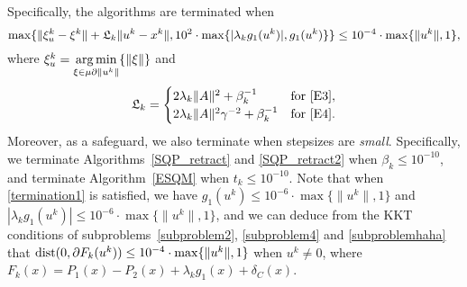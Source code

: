\documentclass[10pt]{article}
\numberwithin{equation}{section}
\def\argmin{\mathop{\rm arg\,min}}
\def\d{{\rm dist}}
\begin{document}
Specifically, the algorithms are terminated when
\begin{equation}\label{termination1}
\max\{\|\xi_u^k - \xi^k\| + {\frak L}_k\|u^k - x^k\|, 10^2\cdot\max\{|\lambda_k g_1(u^k)|, g_1(u^k)\}\} \leq 10^{-4}\cdot\max\{\|u^k\|, 1\},
\end{equation}
where $\xi^k_u = \argmin\limits_{\xi\in \mu\partial \|u^k\|}\{\|\xi\|\}$ and
\[
{\frak L}_k =
\begin{cases}
  2\lambda_k \|A\|^2 + \beta_k^{-1} & \mbox{for \eqref{E3}},\\
  2\lambda_k \|A\|^2\gamma^{-2} + \beta_k^{-1} & \mbox{for \eqref{E4}}.
\end{cases}
\]
Moreover, as a safeguard, we also terminate when stepsizes are \emph{small}. Specifically, we terminate Algorithms~\ref{SQP_retract} and \ref{SQP_retract2} when $\beta_k \le 10^{-10}$, and terminate Algorithm~\ref{ESQM} when $t_k \le 10^{-10}$. Note that when \eqref{termination1} is satisfied, we have $g_1(u^k)\le 10^{-6}\cdot\max\{\|u^k\|, 1\}$ and $|\lambda_k g_1(u^k)|\le 10^{-6}\cdot\max\{\|u^k\|, 1\}$, and we can deduce from the KKT conditions of subproblems~\eqref{subproblem2}, \eqref{subproblem4} and \eqref{subproblemhaha} that $\d(0, \partial F_k(u^k)) \leq 10^{-4}\cdot\max\{\|u^k\|, 1\}$ when $u^k\neq 0$, where $F_k(x) = P_1(x) - P_2(x) + \lambda_kg_1(x) + \delta_C(x)$.
\end{document}
